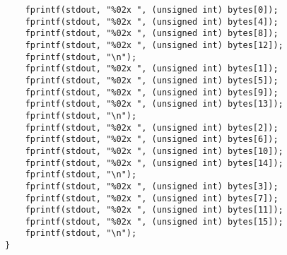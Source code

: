 \documentclass[a4paper]{report}
\begin{document}
\begin{lstlisting}
    fprintf(stdout, "%02x ", (unsigned int) bytes[0]);
    fprintf(stdout, "%02x ", (unsigned int) bytes[4]);
    fprintf(stdout, "%02x ", (unsigned int) bytes[8]);
    fprintf(stdout, "%02x ", (unsigned int) bytes[12]);
    fprintf(stdout, "\n");
    fprintf(stdout, "%02x ", (unsigned int) bytes[1]);
    fprintf(stdout, "%02x ", (unsigned int) bytes[5]);
    fprintf(stdout, "%02x ", (unsigned int) bytes[9]);
    fprintf(stdout, "%02x ", (unsigned int) bytes[13]);
    fprintf(stdout, "\n");
    fprintf(stdout, "%02x ", (unsigned int) bytes[2]);
    fprintf(stdout, "%02x ", (unsigned int) bytes[6]);
    fprintf(stdout, "%02x ", (unsigned int) bytes[10]);
    fprintf(stdout, "%02x ", (unsigned int) bytes[14]);
    fprintf(stdout, "\n");
    fprintf(stdout, "%02x ", (unsigned int) bytes[3]);
    fprintf(stdout, "%02x ", (unsigned int) bytes[7]);
    fprintf(stdout, "%02x ", (unsigned int) bytes[11]);
    fprintf(stdout, "%02x ", (unsigned int) bytes[15]);
    fprintf(stdout, "\n");
}

\end{lstlisting}
\end{document}
